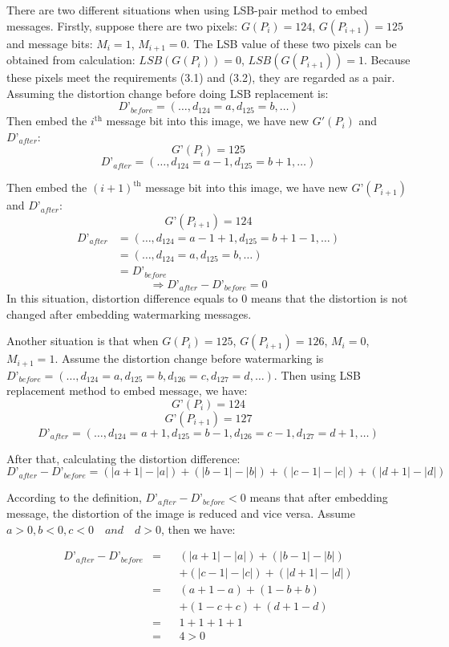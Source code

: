 There are two different situations when using LSB-pair method to embed messages. Firstly, suppose there are two pixels: \(G(P_{i}) = 124\), \(G(P_{i+1}) = 125\) and message bits: \(M_{i} = 1\), \(M_{i+1} = 0\). The LSB value of these two pixels can be obtained from calculation: \(LSB(G(P_{i})) = 0\), \(LSB(G(P_{i+1})) = 1\). Because these pixels meet the requirements (3.1) and (3.2), they are regarded as a pair. Assuming the distortion change before doing LSB replacement is:
\[D’_{before} = (…, d_{124} = a, d_{125} = b, …)\]
Then embed the $i^{\text{th}}$ message bit into this image, we have new \(G'(P_{i})\) and \(D’_{after}\): 
\[G’(P_{i}) = 125\]
\[D’_{after} = (…, d_{124} = a - 1, d_{125} = b + 1, …)\]

Then embed the $(i+1)^{\text{th}}$ message bit into this image, we have new \(G’(P_{i+1})\) and \(D’_{after}\): 
\[G’(P_{i+1}) = 124\]
\begin{align*} 
D’_{after}  &= (…, d_{124} = a - 1 + 1, d_{125} = b + 1 - 1, …)\\
            &= (…, d_{124} = a, d_{125} = b, …)\\
            &= D’_{before}
\end{align*}
\[ \Rightarrow D’_{after} - D’_{before} = 0\]
In this situation, distortion difference equals to 0 means that the distortion is not changed after embedding watermarking messages.

Another situation is that when \(G(P_{i}) = 125\), \(G(P_{i+1}) = 126\), \(M_{i} = 0\), \(M_{i+1} = 1\). Assume the distortion change before watermarking is \(D’_{before} = (…, d_{124} = a, d_{125} = b, d_{126} = c, d_{127} = d, …)\). Then using LSB replacement method to embed message, we have: 
\[G’(P_{i}) = 124\] 
\[G’(P_{i+1}) = 127\]
\[D’_{after} = (…, d_{124} = a + 1, d_{125} = b - 1, d_{126} = c - 1, d_{127} = d + 1, …)\]


After that, calculating the distortion difference: 
\[D’_{after} - D’_{before} = (|a + 1| - |a|) + (|b - 1| - |b|) + (|c - 1| - |c|) + (|d + 1| - |d|)\]

According to the definition, \(D’_{after} - D’_{before} < 0\) means that after embedding message, the distortion of the image is reduced and vice versa. Assume \(a > 0, b < 0, c < 0 \quad and \quad d > 0\), then we have:

\begin{align*} 
D’_{after} - D’_{before}    &= & & (|a + 1| - |a|) + (|b - 1| - |b|)\\
                            &  & & + (|c - 1| - |c|) + (|d + 1| - |d|)\\
                            &= & & (a + 1 - a) + (1 - b + b) \\
                            &  & & + (1 - c + c) + (d + 1 - d)\\
                            &= & & 1 + 1+ 1+ 1\\
                            &= & & 4 > 0
\end{align*}

